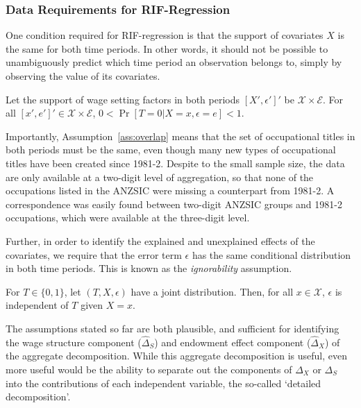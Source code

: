 \subsubsection{Data Requirements for RIF-Regression} \label{sec:id}

One condition required for RIF-regression is that the support of covariates $X$ is the same for both time periods. In other words, it should not be possible to unambiguously predict which time period an observation belongs to, simply by observing the value of its covariates. 
\begin{assumption} \label{ass:overlap}
  Let the support of wage setting factors in both periods $[X',\epsilon']'$ be $\mathcal{X}\times\mathcal{E}$. For all $[x',e']' \in \mathcal{X}\times\mathcal{E}$,  $0 < \Pr[T=0 | X=x, \epsilon=e] < 1$.
\end{assumption}
Importantly, Assumption~\ref{ass:overlap} means that the set of occupational titles in both periods must be the same, even though many new types of occupational titles have been created since 1981-2. Despite to the small sample size, the data are only available at a two-digit level of aggregation, so that none of the occupations listed in the ANZSIC were missing a counterpart from 1981-2. A correspondence was easily found between two-digit ANZSIC groups and 1981-2 occupations, which were available at the three-digit level.

Further, in order to identify the explained and unexplained effects of the covariates, we require that the error term $\epsilon$ has the same conditional distribution in both time periods. This is known as the {\em ignorability} assumption.
\begin{assumption}[Ignorability]
  For $T\in\{0,1\}$, let $(T, X, \epsilon)$ have a joint distribution. Then, for all $x\in \mathcal{X}$, $\epsilon$ is independent of $T$ given $X=x$.
\end{assumption}

The assumptions stated so far are both plausible, and sufficient for identifying the wage structure component ($\hat{\Delta}_S$) and endowment effect component ($\hat{\Delta}_X$) of the aggregate decomposition. While this aggregate decomposition is useful, even more useful would be the ability to separate out the components of $\Delta_X$ or $\Delta_S$ into the contributions of each independent variable, the so-called `detailed decomposition'. 

